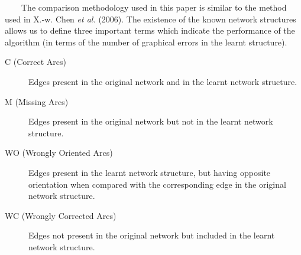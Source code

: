 ~~~~The comparison methodology used in this paper is similar to the method used in X.-w. Chen \emph{et al.} (2006). The existence of the known network structures allows us to define three important terms which indicate the performance of the algorithm (in terms of the number of graphical errors in the learnt structure).

\begin{description}
	\item[C (Correct Arcs)] Edges present in the original network and in the learnt network structure.

	\item[M (Missing Arcs)] Edges present in the original network but not in the learnt network structure.
	
	\item[WO (Wrongly Oriented Arcs)] Edges present in the learnt network structure, but having opposite orientation when compared with the corresponding edge in the original network structure.
	
	\item[WC (Wrongly Corrected Arcs)] Edges not present in the original network but included in the learnt network structure.
\end{description}